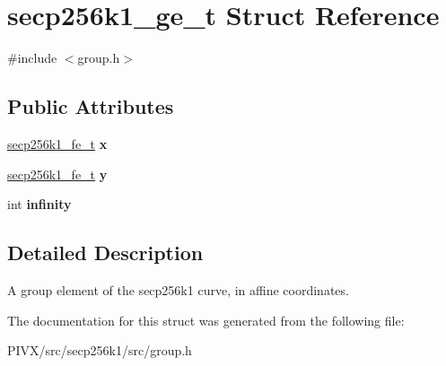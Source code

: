 \hypertarget{structsecp256k1__ge__t}{}\section{secp256k1\+\_\+ge\+\_\+t Struct Reference}
\label{structsecp256k1__ge__t}


{\ttfamily \#include $<$group.\+h$>$}

\subsection*{Public Attributes}
\begin{DoxyCompactItemize}
\item 
\mbox{\label{structsecp256k1__ge__t_a7bf7b52803edbd8ede0987e02dc6bf91}} 
\mbox{\hyperlink{structsecp256k1__fe__t}{secp256k1\+\_\+fe\+\_\+t}} {\bfseries x}
\item 
\mbox{\label{structsecp256k1__ge__t_a3f57d04d3fcf247c663dfbf0b1d95213}} 
\mbox{\hyperlink{structsecp256k1__fe__t}{secp256k1\+\_\+fe\+\_\+t}} {\bfseries y}
\item 
\mbox{\label{structsecp256k1__ge__t_ab713dc3ae3fe62ab3f82dedd77cbf34e}} 
int {\bfseries infinity}
\end{DoxyCompactItemize}


\subsection{Detailed Description}
A group element of the secp256k1 curve, in affine coordinates. 

The documentation for this struct was generated from the following file\+:\begin{DoxyCompactItemize}
\item 
P\+I\+V\+X/src/secp256k1/src/group.\+h\end{DoxyCompactItemize}
